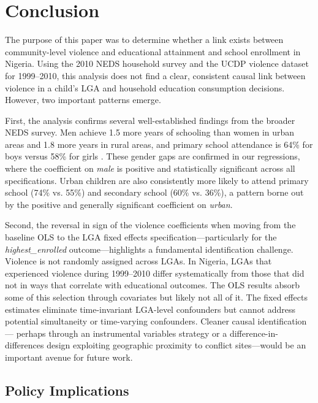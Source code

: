 
\section{Conclusion}
\label{sec:conclusion}

The purpose of this paper was to determine whether a link exists between
community-level violence and educational attainment and school enrollment in
Nigeria. Using the 2010 NEDS household survey and the UCDP violence dataset
for 1999--2010, this analysis does not find a clear, consistent causal link
between violence in a child's LGA and household education consumption
decisions. However, two important patterns emerge.

First, the analysis confirms several well-established findings from the
broader NEDS survey. Men achieve 1.5 more years of schooling than women in
urban areas and 1.8 more years in rural areas, and primary school attendance
is 64\% for boys versus 58\% for girls \citep{neds2010}. These gender gaps
are confirmed in our regressions, where the coefficient on \textit{male} is
positive and statistically significant across all specifications. Urban
children are also consistently more likely to attend primary school (74\% vs.
55\%) and secondary school (60\% vs. 36\%), a pattern borne out by the
positive and generally significant coefficient on \textit{urban}.

Second, the reversal in sign of the violence coefficients when moving from
the baseline OLS to the LGA fixed effects specification---particularly for
the \textit{highest\_enrolled} outcome---highlights a fundamental
identification challenge. Violence is not randomly assigned across LGAs. In
Nigeria, LGAs that experienced violence during 1999--2010 differ
systematically from those that did not in ways that correlate with
educational outcomes. The OLS results absorb some of this selection through
covariates but likely not all of it. The fixed effects estimates eliminate
time-invariant LGA-level confounders but cannot address potential
simultaneity or time-varying confounders. Cleaner causal identification---
perhaps through an instrumental variables strategy or a difference-in-
differences design exploiting geographic proximity to conflict sites---would
be an important avenue for future work.

\subsection{Policy Implications}

